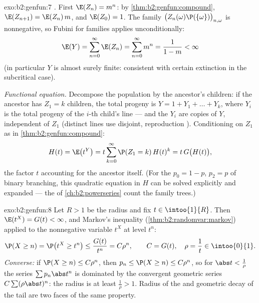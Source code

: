 \begin{solution}{exo:b2:genfun:7}
\emph{.} First $\E(Z_n) = m^n$: by
\cref{thm:b2:genfun:compound}, $\E(Z_{n+1}) = \E(Z_n)\,m$, and
$\E(Z_0) = 1$. The family $\bigl(Z_n(\omega)\P(\{\omega\})
\bigr)_{n, \omega}$ is nonnegative, so Fubini for families applies
unconditionally:
\[
\E(Y) = \sum_{n=0}^{\infty}\E(Z_n)
= \sum_{n=0}^\infty m^n = \frac{1}{1 - m} < \infty
\]
(in particular $Y$ is almost surely finite: consistent with
certain extinction in the subcritical case).

\emph{Functional equation.} Decompose the population by the
ancestor's children: if the ancestor has $Z_1 = k$ children, the
total progeny is $Y = 1 + Y_1 + \dots + Y_k$, where $Y_i$ is the
total progeny of the $i$-th child's line --- and the $Y_i$ are
 copies of $Y$, independent of $Z_1$ (distinct lines
use disjoint,  reproduction ). Conditioning on
$Z_1$ as in \cref{thm:b2:genfun:compound}:
\[
H(t) = \E\bigl(t^Y\bigr)
= t\sum_{k=0}^\infty \P(Z_1 = k)\,H(t)^k
= t\,G\bigl(H(t)\bigr),
\]
the factor $t$ accounting for the ancestor itself. (For the
 $p_0 = 1 - p$, $p_2 = p$ of binary branching, this quadratic
equation in $H$ can be solved explicitly and expanded --- the
 of \cref{ch:b2:powerseries} count the family
trees.)
\end{solution}

\begin{solution}{exo:b2:genfun:8}
Let $R > 1$ be the radius and fix $t \in \intoo{1}{R}$. Then
$\E(t^X) = G(t) < \infty$, and Markov's inequality
(\cref{thm:b2:randomvar:markov}) applied to the nonnegative
variable $t^X$ at level $t^n$:
\[
\P(X \geq n) = \P\bigl(t^X \geq t^n\bigr)
\leq \frac{G(t)}{t^n} = C\rho^n,
\qquad C = G(t),\quad \rho = \frac1t \in \intoo{0}{1}.
\]
\emph{Converse:} if $\P(X \geq n) \leq C\rho^n$, then $p_n \leq
\P(X \geq n) \leq C\rho^n$, so for $\abs t < \frac1\rho$ the
series $\sum p_n\abs t^n$ is dominated by the convergent geometric
series $C\sum(\rho\abs t)^n$: the radius is at least
$\frac1\rho > 1$. Radius of the  and geometric
decay of the tail are two faces of the same property.
\end{solution}

